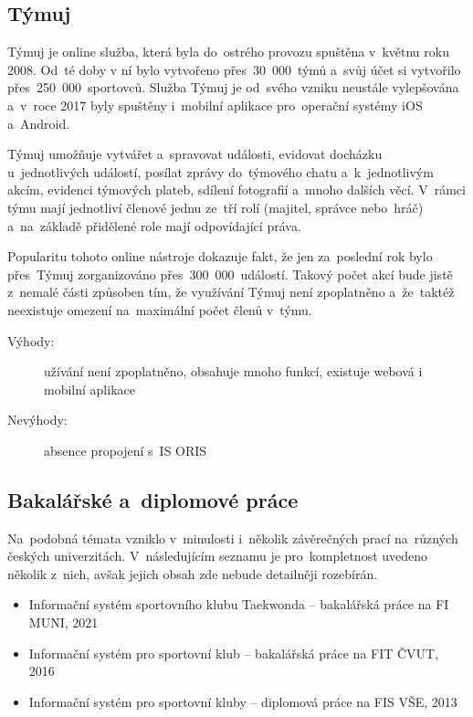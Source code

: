 \subsection{Týmuj}
Týmuj je online služba, která byla do~ostrého provozu spuštěna v~květnu roku 2008. Od~té doby v ní bylo vytvořeno přes~30~000~týmů a~svůj účet si vytvořilo přes~250~000~sportovců. Služba Týmuj je od~svého vzniku neustále vylepšována a~v~roce 2017 byly spuštěny i~mobilní aplikace pro~operační systémy iOS a~Android.

Týmuj umožňuje vytvářet a~spravovat události, evidovat docházku u~jednotlivých událostí, posílat zprávy do~týmového chatu a~k~jednotlivým akcím, evidenci týmových plateb, sdílení fotografií a~mnoho dalších věcí. V~rámci týmu mají jednotliví členové jednu ze~tří rolí (majitel, správce nebo~hráč) a~na~základě přidělené role mají odpovídající práva.

Popularitu tohoto online nástroje dokazuje fakt, že jen za~poslední rok bylo přes~Týmuj zorganizováno přes~300~000~událostí. Takový počet akcí bude jistě z~nemalé části způsoben tím, že využívání Týmuj není zpoplatněno a~že~taktéž neexistuje omezení na~maximální počet členů v~týmu. \cite{tymuj}

\begin{description}
	\item[Výhody:] užívání není zpoplatněno, obsahuje mnoho funkcí, existuje webová i mobilní aplikace
	\item[Nevýhody:] absence propojení s~IS ORIS
\end{description}

\subsection{Bakalářské a~diplomové práce}
Na~podobná témata vzniklo v~minulosti i~několik závěrečných prací na~různých českých univerzitách. V~následujícím seznamu je pro~kompletnost uvedeno několik z~nich, avšak jejich obsah zde nebude detailněji rozebírán.

\begin{itemize}
	\item Informační systém sportovního klubu Taekwonda – bakalářská práce na FI MUNI, 2021 \cite{fimuni2021}
	\item Informační systém pro sportovní klub – bakalářská práce na FIT ČVUT, 2016 \cite{fitcvut2016}
	\item Informační systém pro sportovní kluby – diplomová práce na FIS VŠE, 2013 \cite{fisvse2013}
\end{itemize}
